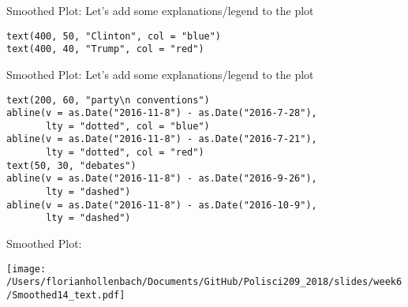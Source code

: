 \documentclass[presentation]{beamer}
\begin{document}
\begin{frame}[fragile,label={sec:orgabccca8}]{Smoothed Plot:}
 Let's add some explanations/legend to the plot

\begin{verbatim}
text(400, 50, "Clinton", col = "blue")
text(400, 40, "Trump", col = "red")
\end{verbatim}
\end{frame}


\begin{frame}[fragile,label={sec:orgab66f0b}]{Smoothed Plot:}
 Let's add some explanations/legend to the plot

\begin{verbatim}
text(200, 60, "party\n conventions")
abline(v = as.Date("2016-11-8") - as.Date("2016-7-28"),
       lty = "dotted", col = "blue")
abline(v = as.Date("2016-11-8") - as.Date("2016-7-21"),
       lty = "dotted", col = "red")
text(50, 30, "debates")
abline(v = as.Date("2016-11-8") - as.Date("2016-9-26"),
       lty = "dashed")
abline(v = as.Date("2016-11-8") - as.Date("2016-10-9"),
       lty = "dashed")
\end{verbatim}
\end{frame}



\begin{frame}[label={sec:org8b5664f}]{Smoothed Plot:}
\begin{center}
\texttt{[image: /Users/florianhollenbach/Documents/GitHub/Polisci209\_2018/slides/week6/Smoothed14\_text.pdf]}
\end{center}
\end{frame}
\end{document}
